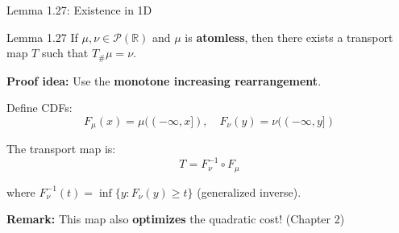 \documentclass[aspectratio=169]{beamer}
\newcommand{\R}{\mathbb{R}}
\newcommand{\Pp}{\mathcal{P}}
\begin{document}
\begin{frame}{Lemma 1.27: Existence in 1D}
\begin{block}{Lemma 1.27}
If $\mu, \nu \in \Pp(\R)$ and $\mu$ is \textbf{atomless}, then there exists a transport map $T$ such that $T_\# \mu = \nu$.
\end{block}

\vspace{0.3cm}
\textbf{Proof idea:} Use the \textbf{monotone increasing rearrangement}.

\vspace{0.2cm}
Define CDFs:
\[
F_\mu(x) = \mu((-\infty, x]), \quad F_\nu(y) = \nu((-\infty, y])
\]

\vspace{0.2cm}
The transport map is:
\[
\boxed{T = F_\nu^{-1} \circ F_\mu}
\]

where $F_\nu^{-1}(t) = \inf\{y : F_\nu(y) \geq t\}$ (generalized inverse).

\vspace{0.3cm}
\textbf{Remark:} This map also \textbf{optimizes} the quadratic cost! (Chapter 2)
\end{frame}
\end{document}
